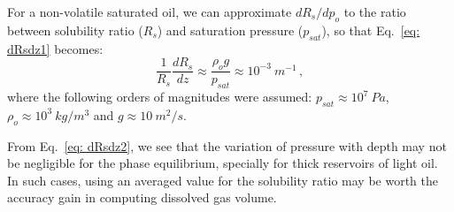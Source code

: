 \documentclass[final,authoryear,5p,times,twocolumn,10pt]{elsarticle}
\begin{document}
For a non-volatile saturated oil, we can approximate $dR_s / dp_o$ to the ratio between  solubility ratio ($R_{s}$) and saturation pressure ($p_{sat}$), so that Eq.~\eqref{eq: dRsdz1} becomes:
\begin{equation}\label{eq: dRsdz2}
\frac{1}{R_s}\frac{d R_s}{dz} \approx \frac{\rho_o g }{p_{sat}} \approx 10^{-3}\ m^{-1} \, ,
\end{equation}
where the following orders of magnitudes were assumed: $p_{sat} \approx 10^{7}\ Pa$, $\rho_o \approx 10^{3}\ kg/m^3$ and $g \approx 10\ m^2/s$. 

From Eq.~\eqref{eq: dRsdz2}, we see that the variation of pressure with depth may not be negligible for the phase equilibrium,  specially for thick reservoirs of light oil. In such cases, using an averaged value for the solubility ratio may be worth the accuracy gain in computing dissolved gas volume.





\end{document}
